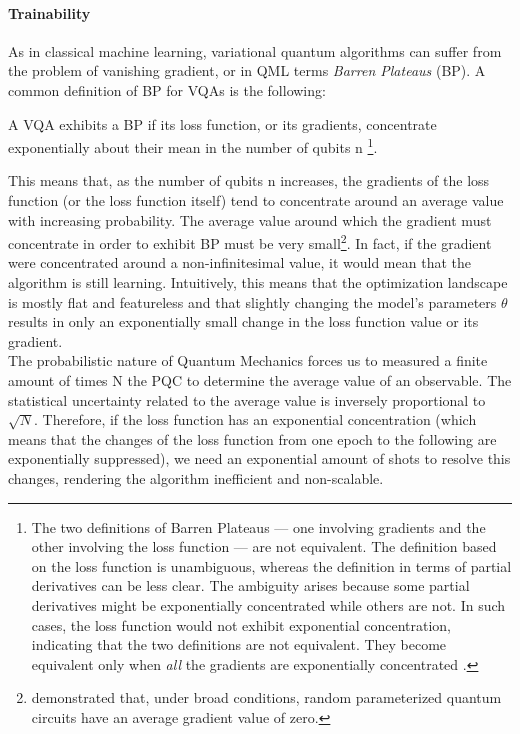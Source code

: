 \paragraph{Trainability}

As in classical machine learning, variational quantum algorithms can suffer from the problem of vanishing 
gradient, or in QML terms \textit{Barren Plateaus} (BP).
A common definition of BP for VQAs is the following:

\begin{defn*}
    A VQA exhibits a BP if its loss function, or its gradients, concentrate exponentially about their mean 
    in the number of qubits n
    \footnote[1]{The two definitions of Barren Plateaus — one involving gradients and the other 
    involving the loss function — are not equivalent. The definition based on the loss function is 
    unambiguous, whereas the definition in terms of partial derivatives can be less clear. The ambiguity 
    arises because some partial derivatives might be exponentially concentrated while others are not. In such 
    cases, the loss function would not exhibit exponential concentration, indicating that the two definitions 
    are not equivalent. They become equivalent only when \textit{all} the gradients are exponentially concentrated 
    \cite{Arrasmith_2022}.}.
\end{defn*}

This means that, as the number of qubits n increases, the gradients of the loss function (or the loss function itself) 
tend to concentrate around an average value with increasing probability.    
The average value around which the gradient must concentrate in order to exhibit BP must be very 
small\footnote[1]{\cite{McClean_2018} demonstrated that, under broad conditions, random parameterized quantum 
circuits have an average gradient value of zero.}.
In fact, if the gradient were concentrated around a non-infinitesimal value, it would mean that the 
algorithm is still learning.
Intuitively, this means that the optimization landscape is mostly flat and featureless and
that slightly changing the model’s parameters $\theta$ results in only an exponentially small change in the loss
function value or its gradient.\\

The probabilistic nature of Quantum Mechanics forces us to measured a finite amount of times N the PQC to determine
the average value of an observable.
The statistical uncertainty related to the average value is inversely proportional to $\sqrt{N}$.
Therefore, if the loss function has an exponential concentration (which means that the changes of the loss function 
from one epoch to the following are exponentially suppressed), we need an exponential amount of shots to resolve this
changes, rendering the algorithm inefficient and non-scalable.
 

